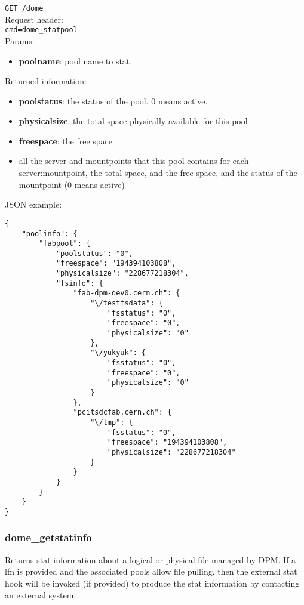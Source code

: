 \documentclass[a4paper,10pt]{scrreprt}
\begin{document}
\lstinline"GET /dome"\\
Request header:\\
\lstinline"cmd=dome_statpool"\\
Params:
\begin{itemize}
 \item \textbf{poolname}: pool name to stat
\end{itemize}

Returned information:
\begin{itemize}
 \item \textbf{poolstatus}: the status of the pool. 0 means active.
 \item \textbf{physicalsize}: the total space physically available for this pool
 \item \textbf{freespace}: the free space
 
 
 \item all the server and mountpoints that this pool contains
 \subitem for each server:mountpoint, the total space, and the free space, and the status of the mountpoint (0 means active)
\end{itemize}

JSON example:\\
\begin{lstlisting}
{
    "poolinfo": {
        "fabpool": {
            "poolstatus": "0",
            "freespace": "194394103808",
            "physicalsize": "228677218304",
            "fsinfo": {
                "fab-dpm-dev0.cern.ch": {
                    "\/testfsdata": {
                        "fsstatus": "0",
                        "freespace": "0",
                        "physicalsize": "0"
                    },
                    "\/yukyuk": {
                        "fsstatus": "0",
                        "freespace": "0",
                        "physicalsize": "0"
                    }
                },
                "pcitsdcfab.cern.ch": {
                    "\/tmp": {
                        "fsstatus": "0",
                        "freespace": "194394103808",
                        "physicalsize": "228677218304"
                    }
                }
            }
        }
    }
}
\end{lstlisting}


\subsubsection{dome\_getstatinfo}
Returns stat information about a logical or physical file managed by DPM.
If a lfn is provided and the associated pools allow file pulling, then the external stat hook will be invoked (if provided)
to produce the stat information by contacting an external system.
\end{document}
